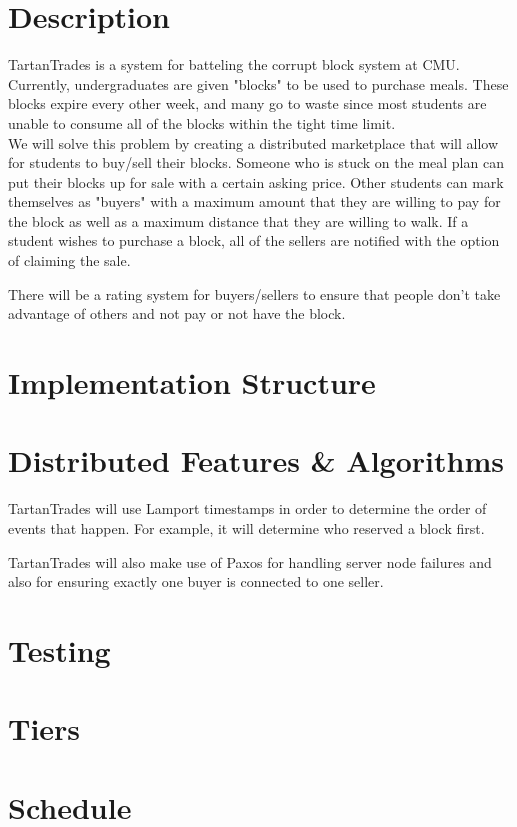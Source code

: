 \documentclass[12pt]{article}
\begin{document}
\maketitle

\section{Description}
\hspace{\fill}

TartanTrades is a system for batteling the corrupt block system at CMU\@.  Currently, undergraduates are given "blocks" to be used to purchase meals.
These blocks expire every other week, and many go to waste since most students are unable to consume all of the blocks within the tight time limit.\\

We will solve this problem by creating a distributed marketplace that will allow for students to buy/sell their blocks.  Someone who is stuck on the meal
plan can put their blocks up for sale with a certain asking price.  Other students can mark themselves as "buyers" with a maximum amount that they are willing
to pay for the block as well as a maximum distance that they are willing to walk.  If a student wishes to purchase a block, all of the sellers are notified with
the option of claiming the sale.

There will be a rating system for buyers/sellers to ensure that people don't take advantage of others and not pay or not have the block.\\


\section{Implementation Structure}


\section{Distributed Features \& Algorithms}

TartanTrades will use Lamport timestamps in order to determine the order of events that happen.  For example, it will determine who reserved a block first.

TartanTrades will also make use of Paxos for handling server node failures and also for ensuring exactly one buyer is connected to one seller.

\section{Testing}


\section{Tiers}


\section{Schedule}
\end{document}
